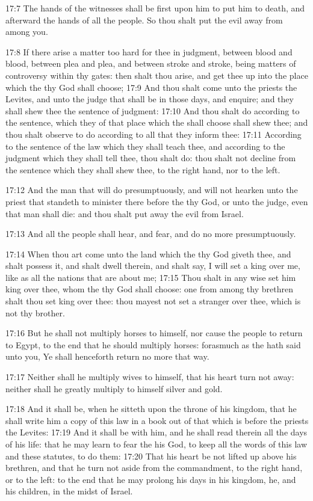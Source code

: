 17:7 The hands of the witnesses shall be first upon him to put him to death, and afterward the hands of all the people. So thou shalt put the evil away from among you.

17:8 If there arise a matter too hard for thee in judgment, between blood and blood, between plea and plea, and between stroke and stroke, being matters of controversy within thy gates: then shalt thou arise, and get thee up into the place which the \LORD thy God shall choose; 17:9 And thou shalt come unto the priests the Levites, and unto the judge that shall be in those days, and enquire; and they shall shew thee the sentence of judgment: 17:10 And thou shalt do according to the sentence, which they of that place which the \LORD shall choose shall shew thee; and thou shalt observe to do according to all that they inform thee: 17:11 According to the sentence of the law which they shall teach thee, and according to the judgment which they shall tell thee, thou shalt do: thou shalt not decline from the sentence which they shall shew thee, to the right hand, nor to the left.

17:12 And the man that will do presumptuously, and will not hearken unto the priest that standeth to minister there before the \LORD thy God, or unto the judge, even that man shall die: and thou shalt put away the evil from Israel.

17:13 And all the people shall hear, and fear, and do no more presumptuously.

17:14 When thou art come unto the land which the \LORD thy God giveth thee, and shalt possess it, and shalt dwell therein, and shalt say, I will set a king over me, like as all the nations that are about me; 17:15 Thou shalt in any wise set him king over thee, whom the \LORD thy God shall choose: one from among thy brethren shalt thou set king over thee: thou mayest not set a stranger over thee, which is not thy brother.

17:16 But he shall not multiply horses to himself, nor cause the people to return to Egypt, to the end that he should multiply horses: forasmuch as the \LORD hath said unto you, Ye shall henceforth return no more that way.

17:17 Neither shall he multiply wives to himself, that his heart turn not away: neither shall he greatly multiply to himself silver and gold.

17:18 And it shall be, when he sitteth upon the throne of his kingdom, that he shall write him a copy of this law in a book out of that which is before the priests the Levites: 17:19 And it shall be with him, and he shall read therein all the days of his life: that he may learn to fear the \LORD his God, to keep all the words of this law and these statutes, to do them: 17:20 That his heart be not lifted up above his brethren, and that he turn not aside from the commandment, to the right hand, or to the left: to the end that he may prolong his days in his kingdom, he, and his children, in the midst of Israel.

